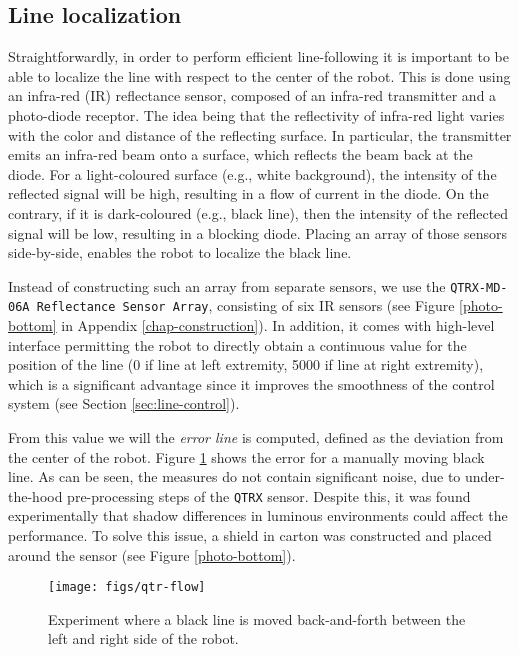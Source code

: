 \documentclass[12pt]{report}
\begin{document}
\subsection*{Line localization}
Straightforwardly, in order to perform efficient line-following it is important to be able to localize the line with respect to the center of the robot. This is done using an infra-red (IR) reflectance sensor, composed of an infra-red transmitter and a photo-diode receptor. The idea being that the reflectivity of infra-red light varies with the color and distance of the reflecting surface. In particular, the transmitter emits an infra-red beam onto a surface, which reflects the beam back at the diode. For a light-coloured surface (e.g., white background), the intensity of the reflected signal will be high, resulting in a flow of current in the diode. On the contrary, if it is dark-coloured (e.g., black line), then the intensity of the reflected signal will be low, resulting in a blocking diode. Placing an array of those sensors side-by-side, enables the robot to localize the black line. 

Instead of constructing such an array from separate sensors, we use the \texttt{QTRX-MD-06A Reflectance Sensor Array}, consisting of six IR sensors (see Figure \ref{photo-bottom} in Appendix \ref{chap-construction}). In addition, it comes with high-level interface permitting the robot to directly obtain a continuous value for the position of the line (0 if line at left extremity, 5000 if line at right extremity), which is a significant advantage since it improves the smoothness of the control system (see Section \ref{sec:line-control}). 

From this value we will the \textit{error line} is computed, defined as the deviation from the center of the robot. Figure \ref{fig:exp-qtr-flow} shows the error for a manually moving black line. As can be seen, the measures do not contain significant noise, due to under-the-hood pre-processing steps of the \texttt{QTRX} sensor. Despite this, it was found experimentally that shadow differences in luminous environments could affect the performance. To solve this issue, a shield in carton was constructed and placed around the sensor (see Figure \ref{photo-bottom}).
\begin{figure}[!h]
\centering
\texttt{[image: figs/qtr-flow]}
\caption{Experiment where a black line is moved back-and-forth between the left and right side of the robot.}
\label{fig:exp-qtr-flow}
\end{figure}
\end{document}
